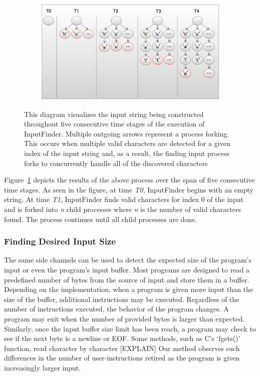 \documentclass{acm_proc_article-sp}
\def \tool {InputFinder}
\begin{document}
\begin{figure}[t]
\centering
\includegraphics[height=2in,width=6.5in]{string_builder.png}
\label{fig:string_builder}
\caption{This diagram visualizes the input string being constructed throughout five consecutive time stages of the execution of \tool{}. Multiple outgoing arrows represent a process forking. This occurs when multiple valid characters are detected for a given index of the input string and, as a result, the finding input process forks to concurrently handle all of the discovered characters}
\end{figure}

Figure~\ref{fig:string_builder} depicts the results of the above process over the span of five consecutive time stages.
As seen in the figure, at time \textit{T0}, \tool{} begins with an empty string.
At time \textit{T1}, \tool{} finds valid characters for index 0 of the input and is forked into \textit{n} child processes where \textit{n} is the number of valid characters found.
The process continues until all child processes are done.

\subsubsection{Finding Desired Input Size}
The same side channels can be used to detect the expected size of the program's input or even the program's input buffer.
Most programs are designed to read a predefined number of bytes from the source of input and store them in a buffer.
Depending on the implementation, when a program is given more input than the size of the buffer, additional instructions may be executed.
Regardless of the number of instructions executed, the behavior of the program changes.
A program may exit when the number of provided bytes is larger than expected.
Similarly, once the input buffer size limit has been reach, a program may check to see if the next byte is a newline or EOF.
Some methods, such as C's `fgets()' function, read character by character [EXPLAIN]
Our method observes such differences in the number of user-instructions retired as the program is given increasingly larger input.
\end{document}
